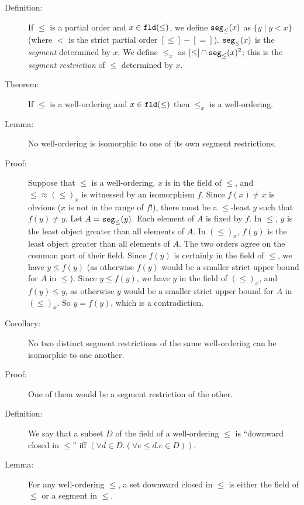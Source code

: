 \documentclass[12pt]{book}
\begin{document}
\begin{description}
\item[Definition:] If $\leq$ is a partial order and $x \in {\tt
fld}(\leq)$, we define ${\tt seg}_{\leq}(x)$ as $\{y \mid y<x\}$
(where $<$ is the strict partial order $[\leq] - [=]$).  ${\tt
seg}_{\leq}(x)$ is the {\em segment\/} determined by $x$.  We define
$\leq_x$ as $[\leq] \cap {\tt seg}_{\leq}(x)^2$; this is the {\em
segment restriction\/} of $\leq$ determined by $x$.

\item[Theorem:]  If $\leq$ is a well-ordering and $x \in {\tt fld}(\leq)$
then $\leq_x$ is a well-ordering.

\item[Lemma:] No well-ordering is isomorphic to one of its own segment
restrictions.

\item[Proof:] Suppose that $\leq$ is a well-ordering, $x$ is in the
field of $\leq$, and $\leq \approx (\leq)_x$ is witnessed by an
isomorphism $f$.  Since $f(x) \neq x$ is obvious ($x$ is not in the
range of $f$!), there must be a $\leq$-least $y$ such that $f(y) \neq
y$.  Let $A={\tt seg}_{\leq}(y)$.  Each element of $A$ is fixed by
$f$.  In $\leq$, $y$ is the least object greater than all elements of
$A$.  In $(\leq)_x$, $f(y)$ is the least object greater than all
elements of $A$.  The two orders agree on the common part of their
field.  Since $f(y)$ is certainly in the field of $\leq$, we have $y
\leq f(y)$ (as otherwise $f(y)$ would be a smaller strict upper bound
for $A$ in $\leq$).  Since $y \leq f(y)$, we have $y$ in the field of
$(\leq)_x$, and $f(y) \leq y$, as otherwise $y$ would be a smaller
strict upper bound for $A$ in $(\leq)_x$.  So $y=f(y)$, which is a
contradiction.

\item[Corollary:] No two distinct segment restrictions of the same
well-ordering can be isomorphic to one another.
\item[Proof:]  One of them would be a segment restriction of the other.

\item[Definition:] We say that a subset $D$ of the field of a
well-ordering $\leq$ is ``downward closed in $\leq$'' iff $(\forall d
\in D.(\forall e \leq d.e \in D))$.

\item[Lemma:]  For any well-ordering $\leq$, a set downward closed in $\leq$
is either the field of $\leq$ or a segment in $\leq$.


\end{description}
\end{document}

